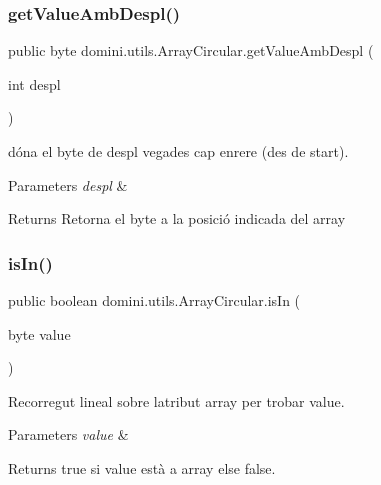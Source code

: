 \subsubsection{\texorpdfstring{get\+Value\+Amb\+Despl()}{getValueAmbDespl()}}
{\footnotesize\ttfamily public byte domini.\+utils.\+Array\+Circular.\+get\+Value\+Amb\+Despl (\begin{DoxyParamCaption}\item[{int}]{despl }\end{DoxyParamCaption})\hspace{0.3cm}{\ttfamily [inline]}}



dóna el byte de despl vegades cap enrere (des de start). 


\begin{DoxyParams}{Parameters}
{\em despl} & \\
\hline
\end{DoxyParams}
\begin{DoxyReturn}{Returns}
Retorna el byte a la posició indicada del array 
\end{DoxyReturn}
\mbox{\label{classdomini_1_1utils_1_1ArrayCircular_aaf106d070b5937f2559a56257dc8cac3}} 
\subsubsection{\texorpdfstring{is\+In()}{isIn()}}
{\footnotesize\ttfamily public boolean domini.\+utils.\+Array\+Circular.\+is\+In (\begin{DoxyParamCaption}\item[{byte}]{value }\end{DoxyParamCaption})\hspace{0.3cm}{\ttfamily [inline]}}



Recorregut lineal sobre l\textquotesingle{}atribut array per trobar value. 


\begin{DoxyParams}{Parameters}
{\em value} & \\
\hline
\end{DoxyParams}
\begin{DoxyReturn}{Returns}
true si value està a array else false. 
\end{DoxyReturn}
\mbox{\label{classdomini_1_1utils_1_1ArrayCircular_a29e48f57c422739fff65e1f5d14c72c2}} 
